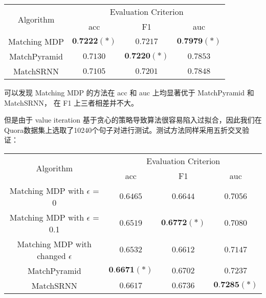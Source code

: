\begin{table}[!htbp]
    \label{tab:MDP_test}
    \centering
    \footnotesize%
    \setlength{\tabcolsep}{4pt}%
    \renewcommand{\arraystretch}{1.2}%
    \begin{tabular}{cccc}
        \hline
        \multirow{2}{*}{Algorithm} &
        \multicolumn{3}{c}{\multirow{1}{*}{Evaluation Criterion}} \\
        \cline{2-4} & acc & F1 & auc \\
        \hline
        Matching MDP & $\textbf{0.7222}(*)$ & $0.7217$ & $\textbf{0.7979}(*)$ \\
        MatchPyramid & $0.7130$ & $\textbf{0.7220}(*)$ & $0.7853$ \\
        MatchSRNN & $0.7105$ & $0.7201$ & $0.7848$\\
        \hline
    \end{tabular}
\end{table}

可以发现 Matching MDP 的方法在 acc 和 auc 上均显著优于 MatchPyramid 和 MatchSRNN， 在 F1 上三者相差并不大。

但是由于 value iteration 基于贪心的策略导致算法很容易陷入过拟合，因此我们在Quora数据集上选取了10240个句子对进行测试。测试方法同样采用五折交叉验证：

\begin{table}[H]
    \label{tab:MDP_small_test}
    \centering
    \footnotesize%
    \setlength{\tabcolsep}{4pt}%
    \renewcommand{\arraystretch}{1.2}%
    \begin{tabular}{cccc}
        \hline
        \multirow{2}{*}{Algorithm} &
        \multicolumn{3}{c}{\multirow{1}{*}{Evaluation Criterion}} \\
        \cline{2-4} & acc & F1 & auc \\
        \hline
        Matching MDP with $\epsilon$ = 0 & $0.6465$ & $0.6644$ & $0.7056$ \\
        Matching MDP with $\epsilon$ = 0.1 & $0.6519$ & $\textbf{0.6772}(*)$ & $0.7080$ \\
        Matching MDP with changed $\epsilon$ & $0.6532$ & $0.6612$ & $0.7147$ \\
        \hline
        MatchPyramid & $\textbf{0.6671}(*)$ & $0.6702$ & $0.7237$ \\
        \hline
        MatchSRNN & $0.6617$ & $0.6736$ & $\textbf{0.7285}(*)$\\
        \hline
    \end{tabular}
\end{table}

